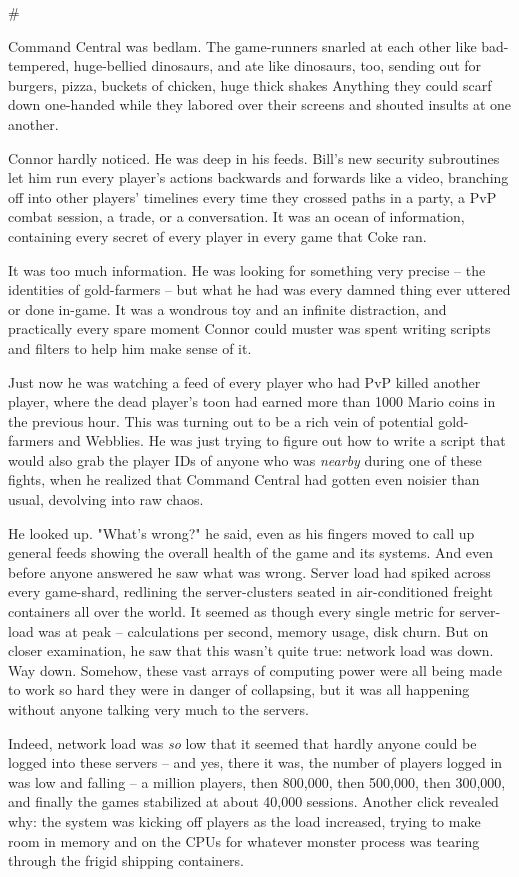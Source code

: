 \#

Command Central was bedlam. The game-runners snarled at each other
like bad-tempered, huge-bellied dinosaurs, and ate like dinosaurs,
too, sending out for burgers, pizza, buckets of chicken, huge thick
shakes Anything they could scarf down one-handed while they labored
over their screens and shouted insults at one another.

Connor hardly noticed. He was deep in his feeds. Bill's new
security subroutines let him run every player's actions backwards
and forwards like a video, branching off into other players'
timelines every time they crossed paths in a party, a PvP combat
session, a trade, or a conversation. It was an ocean of
information, containing every secret of every player in every game
that Coke ran.

It was too much information. He was looking for something very
precise -- the identities of gold-farmers -- but what he had was
every damned thing ever uttered or done in-game. It was a wondrous
toy and an infinite distraction, and practically every spare moment
Connor could muster was spent writing scripts and filters to help
him make sense of it.

Just now he was watching a feed of every player who had PvP killed
another player, where the dead player's toon had earned more than
1000 Mario coins in the previous hour. This was turning out to be a
rich vein of potential gold-farmers and Webblies. He was just
trying to figure out how to write a script that would also grab the
player IDs of anyone who was \emph{nearby} during one of these
fights, when he realized that Command Central had gotten even
noisier than usual, devolving into raw chaos.

He looked up. "What's wrong?" he said, even as his fingers moved to
call up general feeds showing the overall health of the game and
its systems. And even before anyone answered he saw what was wrong.
Server load had spiked across every game-shard, redlining the
server-clusters seated in air-conditioned freight containers all
over the world. It seemed as though every single metric for
server-load was at peak -- calculations per second, memory usage,
disk churn. But on closer examination, he saw that this wasn't
quite true: network load was down. Way down. Somehow, these vast
arrays of computing power were all being made to work so hard they
were in danger of collapsing, but it was all happening without
anyone talking very much to the servers.

Indeed, network load was \emph{so} low that it seemed that hardly
anyone could be logged into these servers -- and yes, there it was,
the number of players logged in was low and falling -- a million
players, then 800,000, then 500,000, then 300,000, and finally the
games stabilized at about 40,000 sessions. Another click revealed
why: the system was kicking off players as the load increased,
trying to make room in memory and on the CPUs for whatever monster
process was tearing through the frigid shipping containers.


